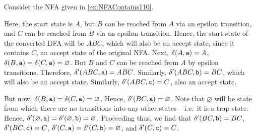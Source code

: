 \begin{Example}
Consider the NFA given in \cref{ex:NFAContains110}.
\begin{center}
\end{center}
Here, the start state is $A$, but $B$ can be reached from $A$ via an epsilon transition, and $C$ can be reached from $B$ via an epsilon transition. Hence, the start state of the converted DFA will be $ABC$, which will also be an accept state, since it contains $C$, an accept state of the original NFA. Next, $\delta(A, \texttt a) = A$, $\delta(B, \texttt a) = \delta(C, \texttt a) = \varnothing$. But $B$ and $C$ can be reached from $A$ by epsilon transitions. Therefore, $\delta'(ABC, \texttt a) = ABC$. Similarly, $\delta'(ABC, \texttt b) = BC$, which will also be an accept state. Similarly, $\delta'(ABC, \texttt c) = C$, also an accept state.
\begin{center}
\end{center}
But now, $\delta(B, \texttt a) = \delta(C, \texttt a) = \varnothing$. Hence, $\delta'(BC, \texttt a) = \varnothing$. Note that $\varnothing$ will be state from which there are no transitions into any other states -- i.e.\ it is a trap state. Hence, $\delta'(\varnothing, \texttt a) = \delta'(\varnothing, \texttt b) = \varnothing$. Proceeding thus, we find that $\delta'(BC, \texttt b) = BC$, $\delta'(BC, \texttt c) = C$, $\delta'(C, \texttt a) = \delta'(C, \texttt b) = \varnothing$, and $\delta'(C, \texttt c) = C$.
\begin{center}
\begin{tikzpicture}[> = stealth, shorten > = 1pt, node distance = 2cm, on grid, auto, initial text =]

\end{tikzpicture}
\end{center}
\end{Example}
